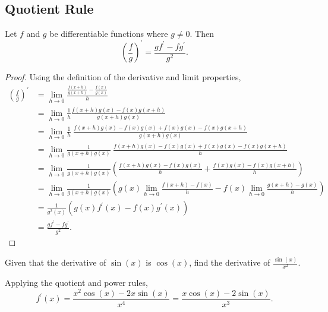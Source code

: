 \subsection{Quotient Rule}
\begin{lemma}
	Let $f$ and $g$ be differentiable functions where $g \neq 0$. Then
	\begin{equation}
		\left(\frac{f}{g}\right)^\prime = \frac{gf^\prime - fg^\prime}{g^2}.
	\end{equation}
\end{lemma}
\begin{proof}
	Using the definition of the derivative and limit properties,
	\begin{align*}
		\left(\frac{f}{g}\right)^\prime &= \lim_{h\to 0}{\frac{\frac{f(x+h)}{g(x+h)} - \frac{f(x)}{g(x)}}{h}} \\
		&= \lim_{h\to 0}{\frac{1}{h}\frac{f(x+h)g(x) - f(x)g(x+h)}{g(x+h)g(x)}} \\
		&= \lim_{h\to 0}{\frac{1}{h}\hspace{3pt}\frac{f(x+h)g(x) - f(x)g(x) + f(x)g(x) - f(x)g(x+h)}{g(x+h)g(x)}} \\
		&= \lim_{h \to 0}{\frac{1}{g(x+h)g(x)}\hspace{3pt}\frac{f(x+h)g(x)-f(x)g(x)+f(x)g(x)-f(x)g(x+h)}{h}} \\
		&= \lim_{h \to 0}{\frac{1}{g(x+h)g(x)}\left(\frac{f(x+h)g(x)-f(x)g(x)}{h}+\frac{f(x)g(x)-f(x)g(x+h)}{h}\right)} \\
		&= \lim_{h \to 0}{\frac{1}{g(x+h)g(x)}} \left(g(x)\lim_{h \to 0}{\frac{f(x+h)-f(x)}{h}} - f(x)\lim_{h\to 0}{\frac{g(x+h)-g(x)}{h}}\right) \\
		&= \frac{1}{g^2(x)}\left(g(x)f^\prime(x) - f(x)g^\prime(x)\right) \\
		&= \frac{gf^\prime - fg^\prime}{g^2}.
	\end{align*}
\end{proof}

\begin{example}
	Given that the derivative of $\sin{(x)}$ is $\cos{(x)}$, find the derivative of $\frac{\sin{(x)}}{x^2}$.
\end{example}
\begin{answer}
	Applying the quotient and power rules,
	\begin{equation*}
		f^\prime(x) = \frac{x^2\cos{(x) - 2x\sin{(x)}}}{x^4} = \frac{x\cos{(x)}-2\sin{(x)}}{x^3}.
	\end{equation*}
\end{answer}